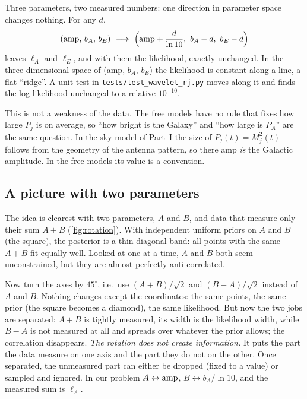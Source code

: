 \documentclass[11pt,a4paper]{article}
\begin{document}
Three parameters, two measured numbers: one direction in parameter space changes
nothing. For any $d$,
\begin{equation}
  ({\rm amp},\,b_A,\,b_E)\ \longrightarrow\ \Big({\rm amp}+\frac{d}{\ln10},\ b_A-d,\ b_E-d\Big)
  \label{eq:ridge}
\end{equation}
leaves $\ell_A$ and $\ell_E$, and with them the likelihood, exactly unchanged. In the
three-dimensional space of (amp, $b_A$, $b_E$) the likelihood is constant along a line,
a flat ``ridge''. A unit test in \texttt{tests/test\_wavelet\_rj.py} moves along it and finds the log-likelihood
unchanged to a relative $10^{-10}$.

This is not a weakness of the data. The free models have no rule that fixes how large
$P_j$ is on average, so ``how bright is the Galaxy'' and ``how large is $P_A$'' are the
same question. In the sky model of Part~I the size of $P_j(t)=M_j^2(t)$ follows from
the geometry of the antenna pattern, so there amp \emph{is} the Galactic amplitude. In
the free models its value is a convention.

\subsection{A picture with two parameters}

The idea is clearest with two parameters, $A$ and $B$, and data that measure only
their sum $A+B$ (\cref{fig:rotation}). With independent uniform priors on $A$ and $B$
(the square), the posterior is a thin diagonal band: all points with the same $A+B$
fit equally well. Looked at one at a time, $A$ and $B$ both seem unconstrained, but
they are almost perfectly anti-correlated.

Now turn the axes by $45^\circ$, i.e.\ use $(A+B)/\sqrt2$ and $(B-A)/\sqrt2$ instead
of $A$ and $B$. Nothing changes except the coordinates: the same points, the same
prior (the square becomes a diamond), the same likelihood. But now the two jobs are
separated: $A+B$ is tightly measured, its width is the likelihood width, while $B-A$
is not measured at all and spreads over whatever the prior allows; the correlation
disappears. \emph{The rotation does not create information.} It puts the part the
data measure on one axis and the part they do not on the other. Once separated, the
unmeasured part can either be dropped (fixed to a value) or sampled and ignored. In
our problem $A\leftrightarrow{\rm amp}$, $B\leftrightarrow b_A/\ln10$, and the
measured sum is $\ell_A$.
\end{document}
